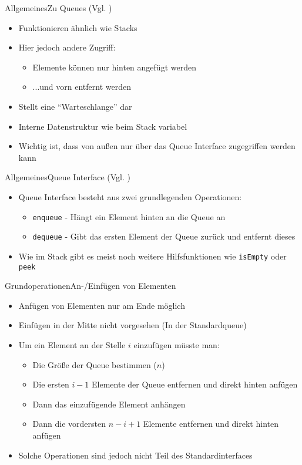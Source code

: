 \begin{frame}{Allgemeines}{Zu Queues (Vgl. \cite{stacksqueues})}
	\begin{itemize}
		\item Funktionieren ähnlich wie Stacks
		\item Hier jedoch andere Zugriff:
		\begin{itemize}
			\item Elemente können nur hinten angefügt werden
			\item ...und vorn entfernt werden
		\end{itemize}
		\item Stellt eine "`Warteschlange"' dar
		\item Interne Datenstruktur wie beim Stack variabel
		\item Wichtig ist, dass von außen nur über das Queue Interface zugegriffen werden kann
	\end{itemize}
\end{frame}

\begin{frame}{Allgemeines}{Queue Interface (Vgl. \cite{stacksqueues})}
	\begin{itemize}
		\item Queue Interface besteht aus zwei grundlegenden Operationen:
		\begin{itemize}
			\item \texttt{enqueue} - Hängt ein Element hinten an die Queue an 
			\item \texttt{dequeue} - Gibt das ersten Element der Queue zurück und entfernt dieses
		\end{itemize}
		\item Wie im Stack gibt es meist noch weitere Hilfsfunktionen wie \texttt{isEmpty} oder \texttt{peek}
	\end{itemize}
\end{frame}

\begin{frame}{Grundoperationen}{An-/Einfügen von Elementen}
	\begin{itemize}
		\item Anfügen von Elementen nur am Ende möglich
		\item Einfügen in der Mitte nicht vorgesehen (In der Standardqueue)
		\item Um ein Element an der Stelle $i$ einzufügen müsste man:
		\begin{itemize}
			\item Die Größe der Queue bestimmen ($n$)
			\item Die ersten $i-1$ Elemente der Queue entfernen und direkt hinten anfügen
			\item Dann das einzufügende Element anhängen
			\item Dann die vordersten $n-i+1$ Elemente entfernen und direkt hinten anfügen
		\end{itemize}
		\item Solche Operationen sind jedoch nicht Teil des Standardinterfaces
	\end{itemize}
\end{frame}

